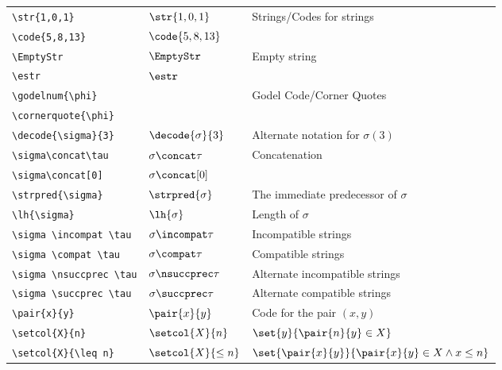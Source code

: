 \documentclass[leqno,11pt]{amsart}
\newcommand{\tab}{\hspace{1cm}}
\begin{document}
\begin{tabular}{l |  l | l}\toprule
	\verb=\str{1,0,1}=		     & \(   \str{1,0,1}           \) & \multirow{2}{*}{Strings/Codes for strings}  \\
	\tab \verb=\code{5,8,13}=                & \(   \code{5,8,13}         \) &   \\ \midrule
	\verb=\EmptyStr=                    & \(   \EmptyStr             \) &  \multirow{2}{*}{Empty string}  \\[6pt]
	\tab \verb=\estr=                        & \(   \estr                 \) &   \\ \midrule
	\verb=\godelnum{\phi}=			& & \multirow{2}{*}{Godel Code/Corner Quotes}\\
	\tab \verb=\cornerquote{\phi}=			& &\\ \midrule
	\verb=\decode{\sigma}{3}=           & \(   \decode{\sigma}{3}    \) & Alternate notation for \( \sigma(3) \)   \\ \midrule
	\verb=\sigma\concat\tau=            & \(   \sigma\concat\tau     \) & \multirow{2}{*}{Concatenation}   \\[6pt]
	\verb=\sigma\concat[0]=             & \(   \sigma\concat[0]      \) &   \\ \midrule
	\verb=\strpred{\sigma}=             & \(   \strpred{\sigma}      \) & The immediate predecessor of \( \sigma \)  \\ \midrule
	\verb=\lh{\sigma}=                  & \(   \lh{\sigma}           \) & Length of \( \sigma \)  \\ \midrule
	\verb=\sigma \incompat \tau=        & \(   \sigma \incompat \tau  \) & Incompatible strings  \\
	\verb=\sigma \compat \tau=          & \(   \sigma \compat \tau   \) &  Compatible strings \\ \midrule
  \verb=\sigma \nsuccprec \tau=        & \(   \sigma \nsuccprec  \tau  \) & Alternate incompatible strings  \\
	\verb=\sigma \succprec \tau=          & \(   \sigma \succprec \tau   \) &  Alternate compatible strings \\ \midrule

	\verb=\pair{x}{y}=                  & \(   \pair{x}{y}           \) & Code for the pair \( (x,y) \)  \\ \midrule
	\verb=\setcol{X}{n}=                & \(   \setcol{X}{n}         \) & \( \set{y}{\pair{n}{y} \in X} \)  \\ \midrule
	\verb=\setcol{X}{\leq n}=           & \(   \setcol{X}{\leq n}    \) & \( \set{ \pair{x}{y}}{\pair{x}{y} \in X \land x \leq n} \)   \\
		\bottomrule
	\end{tabular}
\end{document}
